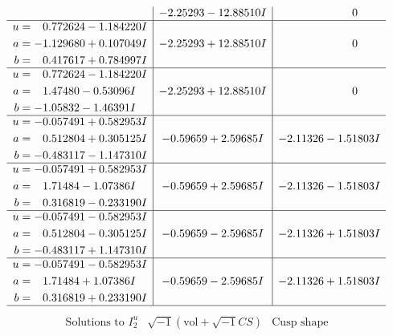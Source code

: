 \documentclass[1p]{elsarticle_modified}
\theoremstyle{definition}
\newcommand{\I}{\sqrt{-1}}
\begin{document}
$$\begin{array}{c|c|c}
 & -2.25293 - 12.88510 I & \phantom{-0.000000 } 0 \\ \hline\begin{aligned}
u &= \phantom{-}0.772624 - 1.184220 I \\
a &= -1.129680 + 0.107049 I \\
b &= \phantom{-}0.417617 + 0.784997 I\end{aligned}
 & -2.25293 + 12.88510 I & \phantom{-0.000000 } 0 \\ \hline\begin{aligned}
u &= \phantom{-}0.772624 - 1.184220 I \\
a &= \phantom{-}1.47480 - 0.53096 I \\
b &= -1.05832 - 1.46391 I\end{aligned}
 & -2.25293 + 12.88510 I & \phantom{-0.000000 } 0 \\ \hline\begin{aligned}
u &= -0.057491 + 0.582953 I \\
a &= \phantom{-}0.512804 + 0.305125 I \\
b &= -0.483117 - 1.147310 I\end{aligned}
 & -0.59659 + 2.59685 I & -2.11326 - 1.51803 I \\ \hline\begin{aligned}
u &= -0.057491 + 0.582953 I \\
a &= \phantom{-}1.71484 - 1.07386 I \\
b &= \phantom{-}0.316819 - 0.233190 I\end{aligned}
 & -0.59659 + 2.59685 I & -2.11326 - 1.51803 I \\ \hline\begin{aligned}
u &= -0.057491 - 0.582953 I \\
a &= \phantom{-}0.512804 - 0.305125 I \\
b &= -0.483117 + 1.147310 I\end{aligned}
 & -0.59659 - 2.59685 I & -2.11326 + 1.51803 I \\ \hline\begin{aligned}
u &= -0.057491 - 0.582953 I \\
a &= \phantom{-}1.71484 + 1.07386 I \\
b &= \phantom{-}0.316819 + 0.233190 I\end{aligned}
 & -0.59659 - 2.59685 I & -2.11326 + 1.51803 I\\
 \hline 
 \end{array}$$\newpage$$\begin{array}{c|c|c}  
\text{Solutions to }I^u_{2}& \I (\text{vol} + \sqrt{-1}CS) & \text{Cusp shape}\\

\end{array}$$
\end{document}
